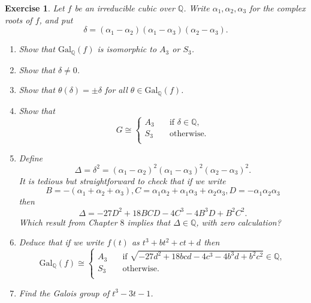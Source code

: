 \documentclass{article}
\newtheorem{exercise}[theorem]{Exercise}
\begin{document}
\begin{exercise}
Let $f$ be an irreducible cubic over $\mathbb{Q}$. Write $\alpha_1,\alpha_2,\alpha_3$ for the complex roots of $f$, and put\[\delta=(\alpha_1-\alpha_2)(\alpha_1-\alpha_3)(\alpha_2-\alpha_3).\]
\begin{enumerate}[label=(\roman*)]
    \item Show that $\text{Gal}_\mathbb{Q}(f)$ is isomorphic to $A_3$ or $S_3$.
    \item Show that $\delta\neq 0$.
    \item Show that $\theta(\delta)=\pm\delta$ for all $\theta\in\text{Gal}_\mathbb{Q}(f)$.
    \item Show that\[G\cong\begin{cases}
       A_3 &\quad\text{if }\delta\in\mathbb{Q}, \\
       S_3 &\quad\text{otherwise.} \\ 
     \end{cases}\]
     \item Define\[\Delta=\delta^2=(\alpha_1-\alpha_2)^2(\alpha_1-\alpha_3)^2(\alpha_2-\alpha_3)^2.\]It is tedious but straightforward to check that if we write\[B=-(\alpha_1+\alpha_2+\alpha_3),C=\alpha_1\alpha_2+\alpha_1\alpha_3+\alpha_2\alpha_3,D=-\alpha_1\alpha_2\alpha_3\]then\[\Delta=-27D^2+18BCD-4C^3-4B^3D+B^2C^2.\]Which result from Chapter $8$ implies that $\Delta\in\mathbb{Q}$, with zero calculation?
     \item Deduce that if we write $f(t)$ as $t^3+bt^2+ct+d$ then\[\text{Gal}_\mathbb{Q}(f)\cong\begin{cases}
       A_3 &\quad\text{if }\sqrt{-27d^2+18bcd-4c^3-4b^3d+b^2c^2}\in\mathbb{Q}, \\
       S_3 &\quad\text{otherwise.} \\ 
     \end{cases}\]
     \item Find the Galois group of $t^3-3t-1$.
\end{enumerate}
\end{exercise}
\end{document}
